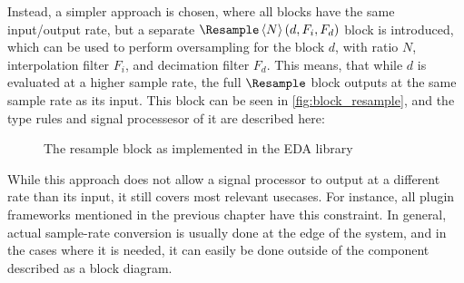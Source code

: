 Instead, a simpler approach is chosen, where all blocks have the same input/output rate, but a separate
$\Resample\left<N\right>(d, F_i, F_d)$ block is introduced, which can be used to perform oversampling for the block
$d$, with ratio $N$, interpolation filter $F_i$, and
decimation filter $F_d$. This means, that while $d$ is evaluated at a
higher sample rate, the full $\Resample$ block outputs at the same sample rate as its input. This
block can be seen in \autoref{fig:block_resample}, and the type rules and signal processesor of it are described
here:

\begin{prooftree}
\end{prooftree}

\begin{prooftree}
\end{prooftree}

\begin{figure}
  \centering
  
  \caption{The resample block as implemented in the EDA library}
  \label{fig:block_resample}
\end{figure}

While this approach does not allow a signal processor to output at a different rate than its input, it still
covers most relevant usecases. For instance, all plugin frameworks mentioned in the previous chapter have
this constraint. In general, actual sample-rate conversion is usually done at the edge of the system, and in
the cases where it is needed, it can easily be done outside of the component described as a block diagram.

